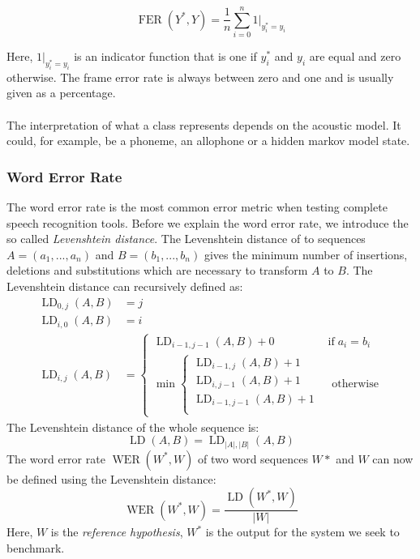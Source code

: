 \[
\operatorname{FER}(Y^*, Y) = \frac{1}{n} \sum_{i = 0}^n 1|_{y^*_i = y_i} 
\]

Here, $1|_{y^*_i = y_i}$ is an indicator function that is one if $y^*_i$ and $y_i$ are equal and zero otherwise. The frame error rate is always between zero and one and is usually given as a percentage. 
\\ \\ 
The interpretation of what a class represents depends on the acoustic model. It could, for example, be a phoneme, an allophone or a hidden markov model state. 

\subsubsection{Word Error Rate}
The word error rate is the most common error metric when testing complete speech recognition tools. Before we explain the word error rate, we introduce the so called \textit{Levenshtein distance}. The Levenshtein distance of to sequences $A = (a_1,...,a_n)$ and $B=(b_1,...,b_n)$ gives the minimum number of insertions, deletions and substitutions which are necessary to transform $A$ to $B$. The Levenshtein distance can recursively defined as:
\begin{align*}
\operatorname{LD}_{0,j}(A, B) &= j \\
\operatorname{LD}_{i,0}(A, B) &= i \\
\operatorname{LD}_{i,j}(A, B) &= \begin{cases}
	\operatorname{LD}_{i-1,j-1}(A, B) + 0 & \text{if} \; a_i = b_i \\
	\min \begin{cases}
		\operatorname{LD}_{i-1,j}(A, B) + 1 \\
		\operatorname{LD}_{i,j-1}(A, B) + 1 \\
		\operatorname{LD}_{i-1,j-1}(A, B) + 1\\
	\end{cases} & \text{ otherwise}
\end{cases}
\end{align*}
\noindent
The Levenshtein distance of the whole sequence is:
\[
\operatorname{LD}(A, B) = \operatorname{LD}_{|A|, |B|}(A, B)
\]
The word error rate $\operatorname{WER}(W^*, W)$ of two word sequences $W*$ and $W$ can now be defined using the Levenshtein distance: \\
\[
\operatorname{WER}(W^*, W) = \frac{\operatorname{LD}(W^*,W)}{|W|}
\]
Here, $W$ is the \textit{reference hypothesis}, $W^*$ is the output for the system we seek to benchmark.
